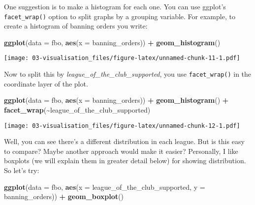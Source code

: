 \documentclass[
]{book}
\newenvironment{Shaded}{\begin{snugshade}}{\end{snugshade}}
\newcommand{\AttributeTok}[1]{\textcolor[rgb]{0.13,0.29,0.53}{#1}}
\newcommand{\FunctionTok}[1]{\textcolor[rgb]{0.13,0.29,0.53}{\textbf{#1}}}
\newcommand{\NormalTok}[1]{#1}
\newcommand{\SpecialCharTok}[1]{\textcolor[rgb]{0.81,0.36,0.00}{\textbf{#1}}}
\begin{document}
One suggestion is to make a histogram for each one. You can use ggplot's \texttt{facet\_wrap()} option to split graphs by a grouping variable. For example, to create a histogram of banning orders you write:

\begin{Shaded}
\begin{Highlighting}[]
\FunctionTok{ggplot}\NormalTok{(}\AttributeTok{data =}\NormalTok{ fbo, }\FunctionTok{aes}\NormalTok{(}\AttributeTok{x =}\NormalTok{ banning\_orders)) }\SpecialCharTok{+} 
  \FunctionTok{geom\_histogram}\NormalTok{()}
\end{Highlighting}
\end{Shaded}

\texttt{[image: 03-visualisation\_files/figure-latex/unnamed-chunk-11-1.pdf]}

Now to split this by \emph{league\_of\_the\_club\_supported}, you use \texttt{facet\_wrap()} in the coordinate layer of the plot.

\begin{Shaded}
\begin{Highlighting}[]
\FunctionTok{ggplot}\NormalTok{(}\AttributeTok{data =}\NormalTok{ fbo, }\FunctionTok{aes}\NormalTok{(}\AttributeTok{x =}\NormalTok{ banning\_orders)) }\SpecialCharTok{+} 
  \FunctionTok{geom\_histogram}\NormalTok{() }\SpecialCharTok{+} 
  \FunctionTok{facet\_wrap}\NormalTok{(}\SpecialCharTok{\textasciitilde{}}\NormalTok{league\_of\_the\_club\_supported)}
\end{Highlighting}
\end{Shaded}

\texttt{[image: 03-visualisation\_files/figure-latex/unnamed-chunk-12-1.pdf]}

Well, you can see there's a different distribution in each league. But is this easy to compare? Maybe another approach would make it easier?
Personally, I like boxplots (we will explain them in greater detail below) for showing distribution. So let's try:

\begin{Shaded}
\begin{Highlighting}[]
\FunctionTok{ggplot}\NormalTok{(}\AttributeTok{data =}\NormalTok{ fbo, }\FunctionTok{aes}\NormalTok{(}\AttributeTok{x =}\NormalTok{ league\_of\_the\_club\_supported, }\AttributeTok{y =}\NormalTok{ banning\_orders)) }\SpecialCharTok{+} 
  \FunctionTok{geom\_boxplot}\NormalTok{() }
\end{Highlighting}
\end{Shaded}
\end{document}
